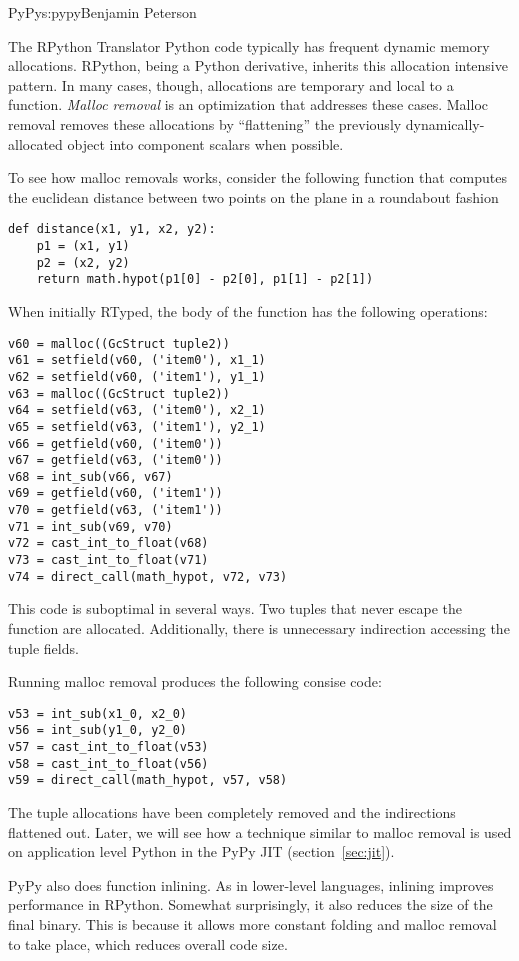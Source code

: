 \begin{aosachapter}{PyPy}{s:pypy}{Benjamin Peterson}
\begin{aosasect1}{The RPython Translator}
Python code typically has frequent dynamic memory allocations. RPython, being a
Python derivative, inherits this allocation intensive pattern. In many cases,
though, allocations are temporary and local to a function. \emph{Malloc removal}
is an optimization that addresses these cases. Malloc removal removes these
allocations by ``flattening'' the previously dynamically-allocated object into
component scalars when possible.

To see how malloc removals works, consider the following function that computes
the euclidean distance between two points on the plane in a roundabout fashion
\begin{verbatim}
def distance(x1, y1, x2, y2):
    p1 = (x1, y1)
    p2 = (x2, y2)
    return math.hypot(p1[0] - p2[0], p1[1] - p2[1])
\end{verbatim}

When initially RTyped, the body of the function has the following operations:
\begin{verbatim}
v60 = malloc((GcStruct tuple2))
v61 = setfield(v60, ('item0'), x1_1)
v62 = setfield(v60, ('item1'), y1_1)
v63 = malloc((GcStruct tuple2))
v64 = setfield(v63, ('item0'), x2_1)
v65 = setfield(v63, ('item1'), y2_1)
v66 = getfield(v60, ('item0'))
v67 = getfield(v63, ('item0'))
v68 = int_sub(v66, v67)
v69 = getfield(v60, ('item1'))
v70 = getfield(v63, ('item1'))
v71 = int_sub(v69, v70)
v72 = cast_int_to_float(v68)
v73 = cast_int_to_float(v71)
v74 = direct_call(math_hypot, v72, v73)
\end{verbatim}
This code is suboptimal in several ways. Two tuples that never escape the
function are allocated. Additionally, there is unnecessary indirection accessing
the tuple fields.

Running malloc removal produces the following consise code:
\begin{verbatim}
v53 = int_sub(x1_0, x2_0)
v56 = int_sub(y1_0, y2_0)
v57 = cast_int_to_float(v53)
v58 = cast_int_to_float(v56)
v59 = direct_call(math_hypot, v57, v58)
\end{verbatim}
The tuple allocations have been completely removed and the indirections
flattened out. Later, we will see how a technique similar to malloc removal is
used on application level Python in the PyPy JIT (section~\ref{sec:jit}).

PyPy also does function inlining. As in lower-level languages, inlining improves
performance in RPython. Somewhat surprisingly, it also reduces the size of the
final binary. This is because it allows more constant folding and malloc removal
to take place, which reduces overall code size.


\end{aosasect1}
\end{aosachapter}
